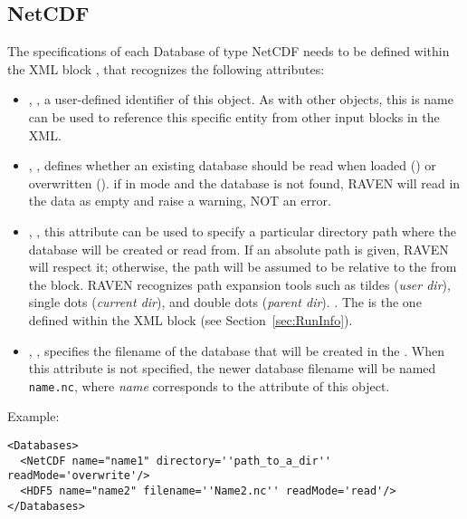 \subsection{NetCDF}
The specifications of each Database of type NetCDF needs to be defined within the
XML block , that recognizes the following attributes:
\vspace{-5mm}
\begin{itemize}
  \itemsep0em
  \item {}, , a user-defined
  identifier of this object.
  \nb As with other objects, this is name can be used to reference this specific
  entity from other input blocks in the XML.
  \item {}, , defines whether an existing database should
    be read when loaded () or overwritten ().
    \nb if in  mode and the database is not found, RAVEN will read in
    the data as empty and raise a warning, NOT an error.
  \item {}, , this attribute
  can be used to specify a particular directory path where the database will be
  created or read from.  If an absolute path is given, RAVEN will respect it; otherwise,
  the path will be assumed to be relative to the  from the  block.
  RAVEN recognizes path expansion tools such as tildes (\emph{user dir}), single dots (\emph{current dir}),
  and double dots (\emph{parent dir}).
  .  The  is
   the one defined within the  XML block (see Section~\ref{sec:RunInfo}).
  \item {}, , specifies the
  filename of the database that will be created in the .
  \nb When this attribute is not specified, the newer database filename will be
  named \texttt{name.nc}, where \textit{name} corresponds to the 
  attribute of this object.
\end{itemize}

Example:
\begin{lstlisting}[style=XML,morekeywords={directory,filename}]
<Databases>
  <NetCDF name="name1" directory=''path_to_a_dir'' readMode='overwrite'/>
  <HDF5 name="name2" filename=''Name2.nc'' readMode='read'/>
</Databases>
\end{lstlisting}



